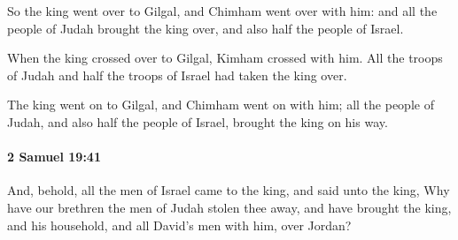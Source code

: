 			\begin{versebox}
					\item[BHS] 
					\item[ASV] So the king went over to Gilgal, and Chimham went over with him: and all the people of Judah brought the king over, and also half the people of Israel.
					\item[NIV] When the king crossed over to Gilgal, Kimham crossed with him. All the troops of Judah and half the troops of Israel had taken the king over.
					\item[NRSV] The king went on to Gilgal, and Chimham went on with him; all the people of Judah, and also half the people of Israel, brought the king on his way.
			\end{versebox}

		\paragraph{2 Samuel 19:41} %
			\label{2SAMUEL-19-41}

			And, behold, all the men of Israel came to the king, and said unto the king, Why have our brethren the men of Judah stolen thee away, and have brought the king, and his household, and all David’s men with him, over Jordan?

